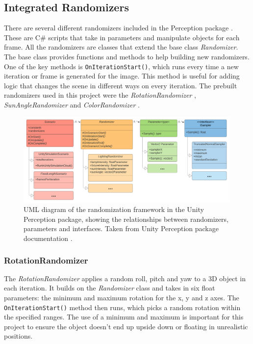 \subsection{Integrated Randomizers}
\label{section:Integrated Randomizers}
There are several different randomizers included in the Perception package \cite{unity-perception2022}. These are C\# scripts that take in parameters and manipulate objects for each frame. All the randomizers are classes that extend the base class \textit{Randomizer}. The base class provides functions and methods to help building new randomizers. One of the key methods is \texttt{OnIterationStart()}, which runs every time a new iteration or frame is generated for the image. This method is useful for adding logic that changes the scene in different ways on every iteration. The prebuilt randomizers used in this project were the \textit{RotationRandomizer} \cite{rotation_randomizer}, \textit{SunAngleRandomizer} \cite{sun_angle_randomizer} and \textit{ColorRandomizer} \cite{color_randomizer}.

\begin{figure}[H]
    \centering
    \includegraphics[width=0.99\textwidth]{Figures/randomization_uml.png}
    \caption{UML diagram of the randomization framework in the Unity Perception package, showing the relationships between randomizers, parameters and interfaces. Taken from Unity Perception package documentation \cite{UMLdiagram}.}
    \label{fig:randomizer class uml}
    
\end{figure}

\subsubsection{RotationRandomizer}
The \textit{RotationRandomizer} \cite{rotation_randomizer} applies a random roll, pitch and yaw to a 3D object in each iteration. It builds on the \textit{Randomizer} class and takes in six float parameters: the minimum and maximum rotation for the x, y and z axes. The \texttt{OnIterationStart()} method then runs, which picks a random rotation within the specified ranges. The use of a minimum and maximum is important for this project to ensure the object doesn’t end up upside down or floating in unrealistic positions.

